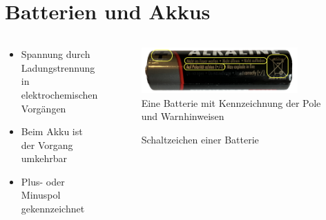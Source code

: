 
\section{Batterien und Akkus}
\label{section:batterien_und_akkus}
\begin{frame}%

\begin{columns}
    \begin{column}{0.48\textwidth}
    \begin{itemize}
  \item Spannung durch Ladungstrennung in elektrochemischen Vorgängen
  \item Beim Akku ist der Vorgang umkehrbar
  \item Plus- oder Minuspol gekennzeichnet
  \end{itemize}

    \end{column}
   \begin{column}{0.48\textwidth}
       
\begin{figure}
    \includegraphics[width=0.85\textwidth]{foto/89}
    \caption{\scriptsize Eine Batterie mit Kennzeichnung der Pole und Warnhinweisen}
    \label{n_Bat_AA}
\end{figure}

\begin{figure}
    \caption{\scriptsize Schaltzeichen einer Batterie}
    \label{n_schaltzeichen_batt}
\end{figure}


   \end{column}
\end{columns}

\end{frame}

\begin{frame}
\end{frame}

